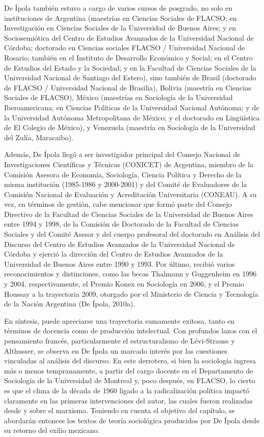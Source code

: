 De Ípola también estuvo a cargo de varios cursos de posgrado, no solo en instituciones de Argentina (maestrías en Ciencias Sociales de FLACSO; en Investigación en Ciencias Sociales de la Universidad de Buenos Aires; y en Sociosemiótica del Centro de Estudios Avanzados de la Universidad Nacional de Córdoba; doctorado en Ciencias sociales FLACSO / Universidad Nacional de Rosario; también en el Instituto de Desarrollo Económico y Social; en el Centro de Estudios del Estado y la Sociedad; y en la Facultad de Ciencias Sociales de la Universidad Nacional de Santiago del Estero), sino también de Brasil (doctorado de FLACSO / Universidad Nacional de Brasilia), Bolivia (maestría en Ciencias Sociales de FLACSO), México (maestrías en Sociología de la Universidad Iberoamericana; en Ciencias Políticas de la Universidad Nacional Autónoma; y de la Universidad Autónoma Metropolitana de México; y el doctorado en Lingüística de El Colegio de México), y Venezuela (maestría en Sociología de la Universidad del Zulía, Maracaibo).

Además, De Ípola llegó a ser investigador principal del Consejo Nacional de Investigaciones Científicas y Técnicas (CONICET) de Argentina, miembro de la Comisión Asesora de Economía, Sociología, Ciencia Política y Derecho de la misma institución (1985-1986 y 2000-2001) y del Comité de Evaluadores de la Comisión Nacional de Evaluación y Acreditación Universitaria (CONEAU). A su vez, en términos de gestión, cabe mencionar que formó parte del Consejo Directivo de la Facultad de Ciencias Sociales de la Universidad de Buenos Aires entre 1994 y 1998, de la Comisión de Doctorado de la Facultad de Ciencias Sociales y del Comité Asesor y del cuerpo profesoral del doctorado en Análisis del Discurso del Centro de Estudios Avanzados de la Universidad Nacional de Córdoba y ejerció la dirección del Centro de Estudios Avanzados de la Universidad de Buenos Aires entre 1990 y 1993. Por último, recibió varios reconocimientos y distinciones, como las becas Thalmann y Guggenheim en 1996 y 2004, respectivamente, el Premio Konex en Sociología en 2006, y el Premio Houssay a la trayectoria 2009, otorgado por el Ministerio de Ciencia y Tecnología de la Nación Argentina (De Ípola, 2010a).

En síntesis, puede apreciarse una trayectoria sumamente exitosa, tanto en términos de docencia como de producción intelectual. Con profundos lazos con el pensamiento francés, particularmente el estructuralismo de Lévi-Strauss y Althusser, se observa en De Ípola un marcado interés por las cuestiones vinculadas al análisis del discurso. En este derrotero, si bien la sociología ingresa más o menos tempranamente, a partir del cargo docente en el Departamento de Sociología de la Universidad de Montreal y, poco después, en FLACSO, lo cierto es que el clima de la década de 1960 ligado a la radicalización política impactó claramente en las primeras intervenciones del autor, las cuales fueron realizadas desde y sobre el marxismo. Teniendo en cuenta el objetivo del capítulo, se abordarán entonces los textos de teoría sociológica producidos por De Ípola desde su retorno del exilio mexicano.

